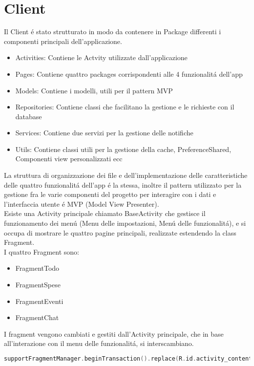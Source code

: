 \section{Client}                 %
Il Client \'e stato strutturato in modo da contenere in Package differenti i componenti principali dell'applicazione.
\begin{itemize}
    \item Activities: Contiene le Actvity utilizzate dall'applicazione
    \item Pages: Contiene quattro packages corrispondenti alle 4 funzionalit\'a dell'app
    \item Models: Contiene i modelli, utili per il pattern MVP
    \item Repositories: Contiene classi che facilitano la gestione e le richieste con il database
    \item Services: Contiene due servizi per la gestione delle notifiche
    \item Utils: Contiene classi utili per la gestione della cache, PreferenceShared, Componenti view personalizzati ecc
\end{itemize}

La struttura di organizzazione dei file e dell'implementazione delle caratteristiche delle quattro funzionalit\'a dell'app \'e la stessa, inoltre il pattern utilizzato per la gestione fra le varie componenti del progetto per interagire con i dati e l'interfaccia utente \'e MVP (Model View Presenter).\\
Esiste una Activity principale chiamato BaseActivity che gestisce il funzionamento dei men\'u (Menu delle impostazioni, Men\'u delle funzionalit\'a), e si occupa di mostrare le quattro pagine principali, realizzate estendendo la class Fragment.\\
I quattro Fragment sono:
\begin{itemize}
    \item FragmentTodo
    \item FragmentSpese
    \item FragmentEventi
    \item FragmentChat
\end{itemize}
I fragment vengono cambiati e gestiti dall'Activity principale, che in base all'interazione con il menu delle funzionalit\'a, si interscambiano.
\begin{lstlisting}[language=kotlin,caption={Hello.kt in Kotlin}]
 supportFragmentManager.beginTransaction().replace(R.id.activity_content, TodoFragment()).commit()
\end{lstlisting}

